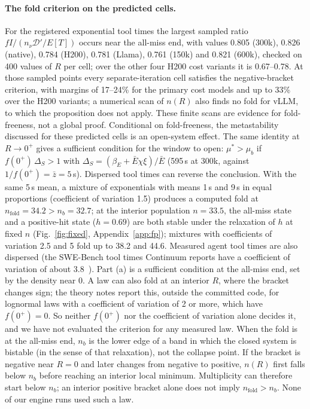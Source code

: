 \paragraph{The fold criterion on the predicted cells.} For the registered exponential tool times the largest sampled ratio $fI/(n_\nu\mathcal D'/E[T])$ occurs near the all-miss end, with values 0.805 (300k), 0.826 (native), 0.784 (H200), 0.781 (Llama), 0.761 (150k) and 0.821 (600k), checked on 400 values of $R$ per cell; over the other four H200 cost variants it is 0.67--0.78. At those sampled points every separate-iteration cell satisfies the negative-bracket criterion, with margins of 17--24\% for the primary cost models and up to 33\% over the H200 variants; a numerical scan of $n(R)$ also finds no fold for vLLM, to which the proposition does not apply. These finite scans are evidence for fold-freeness, not a global proof. Conditional on fold-freeness, the metastability discussed for these predicted cells is an open-system effect. The same identity at $R\to0^+$ gives a sufficient condition for the window to open: $\mu^*>\mu_b$ if $f(0^+)\,\Delta_S>1$ with $\Delta_S=(\beta_E+\bar E\chi\xi)/\bar E$ (595\,s at 300k, against $1/f(0^+)=\bar z=5$\,s). Dispersed tool times can reverse the conclusion. With the same 5\,s mean, a mixture of exponentials with means 1\,s and 9\,s in equal proportions (coefficient of variation 1.5) produces a computed fold at $n_{\mathrm{fold}}=34.2>n_b=32.7$; at the interior population $n=33.5$, the all-miss state and a positive-hit state ($h=0.69$) are both stable under the relaxation of $h$ at fixed $n$ (Fig.~\ref{fig:fixed}, Appendix~\ref{app:fp}); mixtures with coefficients of variation 2.5 and 5 fold up to 38.2 and 44.6. Measured agent tool times are also dispersed (the SWE-Bench tool times Continuum reports have a coefficient of variation of about 3.8~\citep{li2025continuum}). Part (a) is a sufficient condition at the all-miss end, set by the density near 0. A law can also fold at an interior $R$, where the bracket changes sign; the theory notes report this, outside the committed code, for lognormal laws with a coefficient of variation of 2 or more, which have $f(0^+)=0$. So neither $f(0^+)$ nor the coefficient of variation alone decides it, and we have not evaluated the criterion for any measured law. When the fold is at the all-miss end, $n_b$ is the lower edge of a band in which the closed system is bistable (in the sense of that relaxation), not the collapse point. If the bracket is negative near $R=0$ and later changes from negative to positive, $n(R)$ first falls below $n_b$ before reaching an interior local minimum. Multiplicity can therefore start below $n_b$; an interior positive bracket alone does not imply $n_{\mathrm{fold}}>n_b$. None of our engine runs used such a law.

